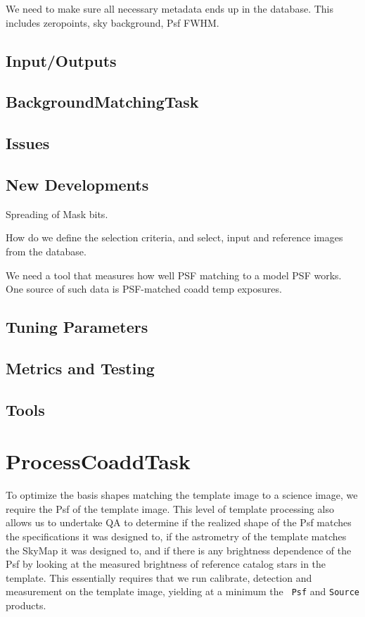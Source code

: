 \documentclass[12pt]{article}
\begin{document}
We need to make sure all necessary metadata ends up in the database.
This includes zeropoints, sky background, Psf FWHM.

\subsection{Input/Outputs}

\subsection{BackgroundMatchingTask} 

\subsection{Issues}

\subsection{New Developments}
Spreading of Mask bits.  

How do we define the selection criteria, and select, input and
reference images from the database.

We need a tool that measures how well PSF matching to a model PSF
works. One source of such data is PSF-matched coadd temp exposures.

\subsection{Tuning Parameters}

\subsection{Metrics and Testing}

\subsection{Tools}


\clearpage 
\section{ProcessCoaddTask} 

To optimize the basis shapes matching the template image to a science
image, we require the Psf of the template image.  This level of
template processing also allows us to undertake QA to determine if the
realized shape of the Psf matches the specifications it was designed
to, if the astrometry of the template matches the SkyMap it was
designed to, and if there is any brightness dependence of the Psf by
looking at the measured brightness of reference catalog stars in the
template.  This essentially requires that we run calibrate, detection
and measurement on the template image, yielding at a minimum the {\tt
  Psf} and {\tt Source} products.
\end{document}
